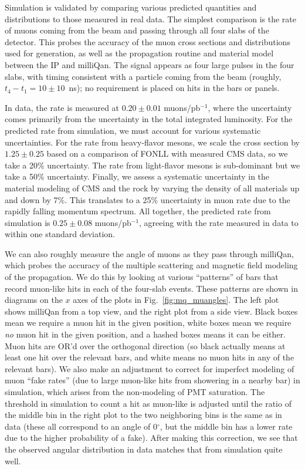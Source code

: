 {Simulation is validated by comparing various predicted quantities and distributions
to those measured in real data. The simplest comparison is the rate of muons coming
from the beam and passing through all four slabs of the detector. This probes the accuracy
of the muon cross sections and \pt distributions used for generation,
as well as the propagation routine and material model between the IP and milliQan.
The signal appears as four large pulses in the four slabs, with timing consistent
with a particle coming from the beam (roughly, $t_4-t_1=10\pm10$~ns); no requirement is
placed on hits in the bars or panels.

In data, the rate is measured at $0.20\pm0.01$ muons/pb$^{-1}$, where the uncertainty
comes primarily from the uncertainty in the total integrated luminosity.
For the predicted rate from simulation, we must account for various systematic
uncertainties. For the rate from heavy-flavor mesons, we scale the cross section
by $1.25\pm0.25$ based on a comparison of FONLL with measured CMS data, so we take
a 20\% uncertainty. The rate from light-flavor mesons is sub-dominant but we take a
50\% uncertainty. Finally, we assess a systematic uncertainty in the material modeling
of CMS and the rock by varying the density of all materials up and down by 7\%.
This translates to a 25\% uncertainty in muon rate due to the rapidly falling
momentum spectrum. All together, the predicted rate from simulation is
$0.25\pm0.08$ muons/pb$^{-1}$, agreeing with the rate measured in data
to within one standard deviation.

We can also roughly measure the angle of muons as they pass through milliQan,
which probes the accuracy of the multiple scattering and magnetic field modeling
of the propagation. We do this by looking at various ``patterns'' of bars
that record muon-like hits in each of the four-slab events. These patterns are shown
in diagrams on the $x$ axes of the plots in Fig.~\ref{fig:mq_muangles}. The left plot shows
milliQan from a top view, and the right plot from a side view. Black boxes mean we require
a muon hit in the given position, white boxes mean we require \textit{no} muon hit
in the given position, and a hashed boxes means it can be either. Muon hits are OR'd
over the orthogonal direction (so black actually means at least one hit over the relevant
bars, and white means no muon hits in any of the relevant bars).
We also make an adjustment to correct for imperfect modeling of muon ``fake rates''
(due to large muon-like hits from showering in a nearby bar) in simulation, which 
arises from the non-modeling of PMT saturation. The \Npe threshold in simulation
to count a hit as muon-like is adjusted until the ratio of the middle bin in the right
plot to the two neighboring bins is the same as in data (these all correspond to 
an angle of 0$^\circ$, but the middle bin has a lower rate due to the higher probability of a fake).
After making this correction, we see that the observed angular distribution in data matches that
from simulation quite well. 

}
